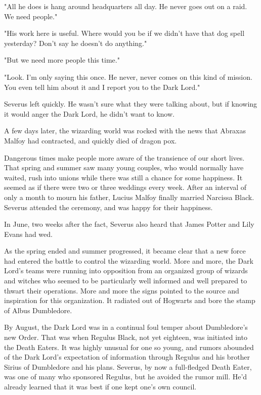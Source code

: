 \documentclass[a4paper,11pt]{article}
\begin{document}
"All he does is hang around headquarters all day. He never goes out on a raid. We need people."

"His work here is useful. Where would you be if we didn't have that dog spell yesterday? Don't say he doesn't do anything."

"But we need more people this time."

"Look. I'm only saying this once. He never, never comes on this kind of mission. You even tell him about it and I report you to the Dark Lord."

Severus left quickly. He wasn't sure what they were talking about, but if knowing it would anger the Dark Lord, he didn't want to know.

A few days later, the wizarding world was rocked with the news that Abraxas Malfoy had contracted, and quickly died of dragon pox.

Dangerous times make people more aware of the transience of our short lives. That spring and summer saw many young couples, who would normally have waited, rush into unions while there was still a chance for some happiness. It seemed as if there were two or three weddings every week. After an interval of only a month to mourn his father, Lucius Malfoy finally married Narcissa Black. Severus attended the ceremony, and was happy for their happiness.

In June, two weeks after the fact, Severus also heard that James Potter and Lily Evans had wed.

As the spring ended and summer progressed, it became clear that a new force had entered the battle to control the wizarding world. More and more, the Dark Lord's teams were running into opposition from an organized group of wizards and witches who seemed to be particularly well informed and well prepared to thwart their operations. More and more the signs pointed to the source and inspiration for this organization. It radiated out of Hogwarts and bore the stamp of Albus Dumbledore.

By August, the Dark Lord was in a continual foul temper about Dumbledore's new Order. That was when Regulus Black, not yet eighteen, was initiated into the Death Eaters. It was highly unusual for one so young, and rumors abounded of the Dark Lord's expectation of information through Regulus and his brother Sirius of Dumbledore and his plans. Severus, by now a full-fledged Death Eater, was one of many who sponsored Regulus, but he avoided the rumor mill. He'd already learned that it was best if one kept one's own council.
\end{document}
